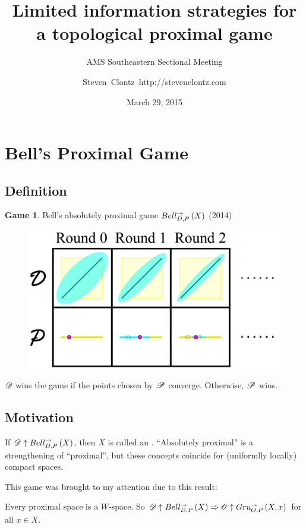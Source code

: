 \documentclass{beamer}
\title
{Limited information strategies for a topological proximal game}
\subtitle
{AMS Southeastern Sectional Meeting} %
\author%
{Steven~Clontz~http://stevenclontz.com}%
\institute[Auburn University] %
{
  Department of Mathematics and Statistics\\
  Auburn University}
\date[15-03-29] %
{March 29, 2015}
\theoremstyle{definition}
\newtheorem{game}[theorem]{Game}
\begin{document}
\newcommand{\vspacing}{\vspace{1em}}
\newcommand{\vpause}{\pause\vspacing}

\begin{frame}
  \titlepage
\end{frame}


\section{Bell's Proximal Game}

\subsection{Definition}

\begin{frame}
  \small
  \begin{game}
  Bell's absolutely proximal game $Bell_{D,P}^{\to}\left({X}\right)$ \cite{MR3239205} (2014)
    \begin{figure}
      \includegraphics[width=0.6\linewidth]{proximalGamePrime.pdf}
    \end{figure}

  $\mathscr{D}$ wins the game if the points chosen by $\mathscr{P}$ converge.
  Otherwise, $\mathscr{P}$ wins.
  \end{game}
\end{frame}

\subsection{Motivation}

\begin{frame}
  If $\mathscr{D}\uparrow Bell_{D,P}^{\to}\left({X}\right)$, then $X$ is called an
  .
  ``Absolutely proximal'' is a strengthening of ``proximal'', but these
  concepts coincide for (uniformlly locally) compact spaces.

  \vpause

  This game was brought to my attention due to this result: \cite{MR3239205}

  \begin{theorem}
    Every proximal space is a $W$-space. So
    $\mathscr{D}\uparrow Bell_{D,P}^{\to}\left({X}\right) \Rightarrow \mathscr{O}\uparrow Gru_{O,P}^{\to}\left({X},{x}\right)$
    for all $x\in X$.
  \end{theorem}
\end{frame}
\end{document}
